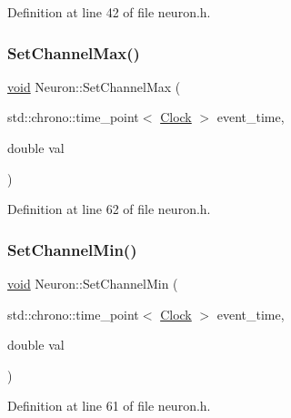 Definition at line 42 of file neuron.\+h.

\mbox{\label{class_neuron_aed1ba99e24b905cd91a519c33b5a62b0}} 
\subsubsection{\texorpdfstring{Set\+Channel\+Max()}{SetChannelMax()}}
{\footnotesize\ttfamily \mbox{\hyperlink{glad_8h_a950fc91edb4504f62f1c577bf4727c29}{void}} Neuron\+::\+Set\+Channel\+Max (\begin{DoxyParamCaption}\item[{std\+::chrono\+::time\+\_\+point$<$ \mbox{\hyperlink{universe_8h_a0ef8d951d1ca5ab3cfaf7ab4c7a6fd80}{Clock}} $>$}]{event\+\_\+time,  }\item[{double}]{val }\end{DoxyParamCaption})\hspace{0.3cm}{\ttfamily [inline]}}



Definition at line 62 of file neuron.\+h.

\mbox{\label{class_neuron_ae463ad8173c63e7970a5f4594667d481}} 
\subsubsection{\texorpdfstring{Set\+Channel\+Min()}{SetChannelMin()}}
{\footnotesize\ttfamily \mbox{\hyperlink{glad_8h_a950fc91edb4504f62f1c577bf4727c29}{void}} Neuron\+::\+Set\+Channel\+Min (\begin{DoxyParamCaption}\item[{std\+::chrono\+::time\+\_\+point$<$ \mbox{\hyperlink{universe_8h_a0ef8d951d1ca5ab3cfaf7ab4c7a6fd80}{Clock}} $>$}]{event\+\_\+time,  }\item[{double}]{val }\end{DoxyParamCaption})\hspace{0.3cm}{\ttfamily [inline]}}



Definition at line 61 of file neuron.\+h.

\mbox{\label{class_neuron_a92f942f6f0bd783c39bb550cf4bb8fd0}} 
